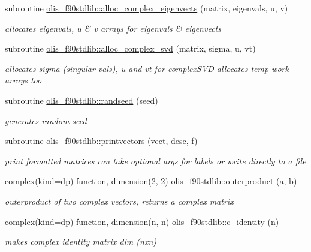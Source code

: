\begin{DoxyCompactItemize}
\item 
subroutine \hyperlink{namespaceolis__f90stdlib_af0119bd404337367bc0727decf6dd89c}{olis\+\_\+f90stdlib\+::alloc\+\_\+complex\+\_\+eigenvects} (matrix, eigenvals, u, v)
\begin{DoxyCompactList}\small\item\em allocates eigenvals, u \& v arrays for eigenvals \& eigenvects \end{DoxyCompactList}\item 
subroutine \hyperlink{namespaceolis__f90stdlib_a31420ff7579f33919c00c26753b56612}{olis\+\_\+f90stdlib\+::alloc\+\_\+complex\+\_\+svd} (matrix, sigma, u, vt)
\begin{DoxyCompactList}\small\item\em allocates sigma (singular vals), u and vt for complex\+S\+VD  allocates temp work arrays too \end{DoxyCompactList}\item 
subroutine \hyperlink{namespaceolis__f90stdlib_a560e235cbabaf74da88a2ec97eda5628}{olis\+\_\+f90stdlib\+::randseed} (seed)
\begin{DoxyCompactList}\small\item\em generates random seed \end{DoxyCompactList}\item 
subroutine \hyperlink{namespaceolis__f90stdlib_a9780b39329025edfdef71ce07e250808}{olis\+\_\+f90stdlib\+::printvectors} (vect, desc, \hyperlink{num__hom_8f90_a2ea4612463aead6dff28d647f3800909}{f})
\begin{DoxyCompactList}\small\item\em print formatted matrices  can take optional args for labels or write directly to a file \end{DoxyCompactList}\item 
complex(kind=dp) function, dimension(2, 2) \hyperlink{namespaceolis__f90stdlib_a9b646e61678500e78a9c48747a07bdf0}{olis\+\_\+f90stdlib\+::outerproduct} (a, b)
\begin{DoxyCompactList}\small\item\em outerproduct of two complex vectors, returns a complex matrix \end{DoxyCompactList}\item 
complex(kind=dp) function, dimension(n, n) \hyperlink{namespaceolis__f90stdlib_a2ff3837ae1f9273552a2716064a46fce}{olis\+\_\+f90stdlib\+::c\+\_\+identity} (n)
\begin{DoxyCompactList}\small\item\em makes complex identity matrix dim (nxn) \end{DoxyCompactList}\item 

\end{DoxyCompactItemize}
